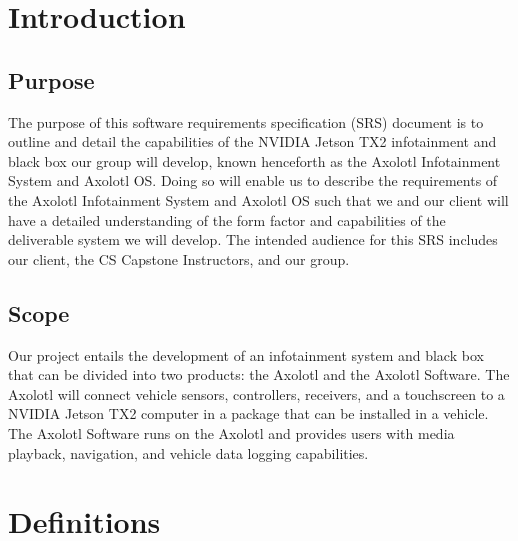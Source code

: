 \documentclass[onecolumn, draftclsnofoot,10pt, compsoc]{IEEEtran}
\begin{document}
\newpage
{}
\tableofcontents
\clearpage

\section{Introduction}
\subsection{Purpose}
The purpose of this software requirements specification (SRS) document is to outline and detail the capabilities of the NVIDIA Jetson TX2 infotainment and black box our group will develop, known henceforth as the Axolotl Infotainment System and Axolotl OS. Doing so will enable us to describe the requirements of the Axolotl Infotainment System and Axolotl OS such that we and our client will have a detailed understanding of the form factor and capabilities of the deliverable system we will develop. The intended audience for this SRS includes our client, the CS Capstone Instructors, and our group.\par

\subsection{Scope}
Our project entails the development of an infotainment system and black box that can be divided into two products: the Axolotl and the Axolotl Software. The Axolotl will connect vehicle sensors, controllers, receivers, and a touchscreen to a NVIDIA Jetson TX2 computer in a package that can be installed in a vehicle. The Axolotl Software runs on the Axolotl and provides users with media playback, navigation, and vehicle data logging capabilities.\par


\section{Definitions}
\end{document}
